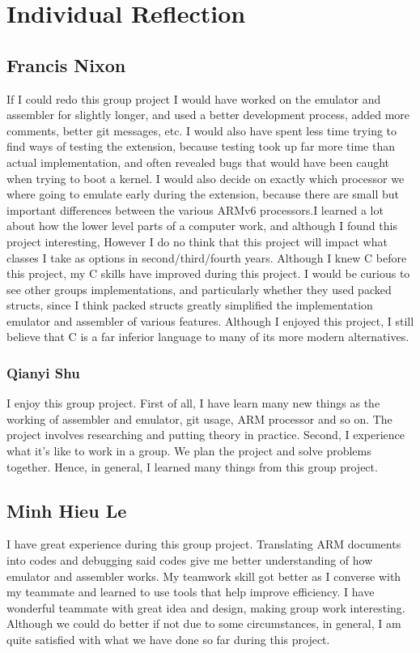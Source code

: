 \documentclass{article}
\begin{document}
\section{Individual Reflection}

\subsection{Francis Nixon}

If I could redo this group project I would have worked on the emulator and assembler for slightly longer, and used a better development process, added more comments, better git messages, etc. I would also have spent less time trying to find ways of testing the extension, because testing took up far more time than actual implementation, and often revealed bugs that would have been caught when trying to boot a kernel. I would also decide on exactly which processor we where going to emulate early during the extension, because there are small but important differences between the various ARMv6 processors.I learned a lot about how the lower level parts of a computer work, and although I found this project interesting, However I do no think that this project will impact what classes I take as options in second/third/fourth years. Although I knew C before this project, my C skills have improved during this project. I would be curious to see other groups implementations, and particularly whether they used packed structs, since I think packed structs greatly simplified the implementation emulator and assembler of various features. Although I enjoyed this project, I still believe that C is a far inferior language to many of its more modern alternatives.

\subsubsection{Qianyi Shu}
I enjoy this group project.
First of all, I have learn many new things as the working of assembler and emulator, git usage, ARM processor and so on. The project involves researching and putting theory in practice.
Second, I experience what it's like to work in a group. We plan the project and solve problems together.
Hence, in general, I learned many things from this group project. 

\subsection{Minh Hieu Le}
I have great experience during this group project. 
Translating ARM documents into codes and debugging said codes give me better understanding of how emulator and assembler works. My teamwork skill got better as I converse with my teammate and learned to use tools that help improve efficiency. 
I have wonderful teammate with great idea and design, making group work interesting.
Although we could do better if not due to some circumstances, in general, I am quite satisfied with what we have done so far during this project.
\end{document}
